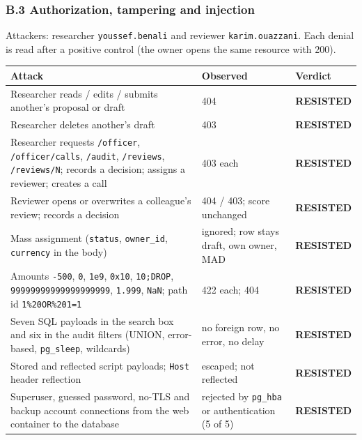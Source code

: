 \documentclass[10pt,a4paper]{article}
\newcommand{\code}[1]{\nolinkurl{#1}}
\newcommand{\resisted}[1]{\textcolor{okgreen}{\textbf{#1}}}
\begin{document}
\subsubsection*{B.3 Authorization, tampering and injection}
Attackers: researcher \code{youssef.benali} and reviewer \code{karim.ouazzani}. Each denial is read after a positive control (the owner opens the same resource with 200).
\begin{center}\scriptsize
\begin{tabularx}{\linewidth}{@{}YL{2.8cm}L{2.2cm}@{}}\toprule\textbf{Attack}&\textbf{Observed}&\textbf{Verdict}\\\midrule
Researcher reads / edits / submits another's proposal or draft & 404 & \resisted{RESISTED}\\
Researcher deletes another's draft & 403 & \resisted{RESISTED}\\
Researcher requests \code{/officer}, \code{/officer/calls}, \code{/audit}, \code{/reviews}, \code{/reviews/N}; records a decision; assigns a reviewer; creates a call & 403 each & \resisted{RESISTED}\\
Reviewer opens or overwrites a colleague's review; records a decision & 404 / 403; score unchanged & \resisted{RESISTED}\\
Mass assignment (\code{status}, \code{owner\_id}, \code{currency} in the body) & ignored; row stays draft, own owner, MAD & \resisted{RESISTED}\\
Amounts \code{-500}, \code{0}, \code{1e9}, \code{0x10}, \code{10;DROP}, \code{99999999999999999999}, \code{1.999}, \code{NaN}; path id \code{1\%20OR\%201=1} & 422 each; 404 & \resisted{RESISTED}\\
Seven SQL payloads in the search box and six in the audit filters (UNION, error-based, \code{pg\_sleep}, wildcards) & no foreign row, no error, no delay & \resisted{RESISTED}\\
Stored and reflected script payloads; \code{Host} header reflection & escaped; not reflected & \resisted{RESISTED}\\
Superuser, guessed password, no-TLS and backup account connections from the web container to the database & rejected by \code{pg\_hba} or authentication (5 of 5) & \resisted{RESISTED}\\
\bottomrule\end{tabularx}\end{center}
\end{document}
